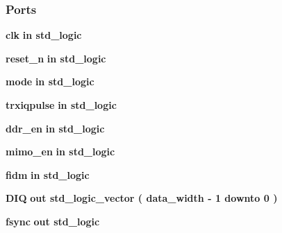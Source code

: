 \subsubsection*{Ports}
 \begin{DoxyCompactItemize}
\item 
{\bf clk}  {\bfseries {\bfseries \textcolor{keywordflow}{in}\textcolor{vhdlchar}{ }}} {\bfseries \textcolor{comment}{std\+\_\+logic}\textcolor{vhdlchar}{ }} 
\item 
{\bf reset\+\_\+n}  {\bfseries {\bfseries \textcolor{keywordflow}{in}\textcolor{vhdlchar}{ }}} {\bfseries \textcolor{comment}{std\+\_\+logic}\textcolor{vhdlchar}{ }} 
\item 
{\bf mode}  {\bfseries {\bfseries \textcolor{keywordflow}{in}\textcolor{vhdlchar}{ }}} {\bfseries \textcolor{comment}{std\+\_\+logic}\textcolor{vhdlchar}{ }} 
\item 
{\bf trxiqpulse}  {\bfseries {\bfseries \textcolor{keywordflow}{in}\textcolor{vhdlchar}{ }}} {\bfseries \textcolor{comment}{std\+\_\+logic}\textcolor{vhdlchar}{ }} 
\item 
{\bf ddr\+\_\+en}  {\bfseries {\bfseries \textcolor{keywordflow}{in}\textcolor{vhdlchar}{ }}} {\bfseries \textcolor{comment}{std\+\_\+logic}\textcolor{vhdlchar}{ }} 
\item 
{\bf mimo\+\_\+en}  {\bfseries {\bfseries \textcolor{keywordflow}{in}\textcolor{vhdlchar}{ }}} {\bfseries \textcolor{comment}{std\+\_\+logic}\textcolor{vhdlchar}{ }} 
\item 
{\bf fidm}  {\bfseries {\bfseries \textcolor{keywordflow}{in}\textcolor{vhdlchar}{ }}} {\bfseries \textcolor{comment}{std\+\_\+logic}\textcolor{vhdlchar}{ }} 
\item 
{\bf D\+IQ}  {\bfseries {\bfseries \textcolor{keywordflow}{out}\textcolor{vhdlchar}{ }}} {\bfseries \textcolor{comment}{std\+\_\+logic\+\_\+vector}\textcolor{vhdlchar}{ }\textcolor{vhdlchar}{(}\textcolor{vhdlchar}{ }\textcolor{vhdlchar}{ }\textcolor{vhdlchar}{ }\textcolor{vhdlchar}{ }{\bfseries {\bf data\+\_\+width}} \textcolor{vhdlchar}{-\/}\textcolor{vhdlchar}{ } \textcolor{vhdldigit}{1} \textcolor{vhdlchar}{ }\textcolor{keywordflow}{downto}\textcolor{vhdlchar}{ }\textcolor{vhdlchar}{ } \textcolor{vhdldigit}{0} \textcolor{vhdlchar}{ }\textcolor{vhdlchar}{)}\textcolor{vhdlchar}{ }} 
\item 
{\bf fsync}  {\bfseries {\bfseries \textcolor{keywordflow}{out}\textcolor{vhdlchar}{ }}} {\bfseries \textcolor{comment}{std\+\_\+logic}\textcolor{vhdlchar}{ }} 
\end{DoxyCompactItemize}


